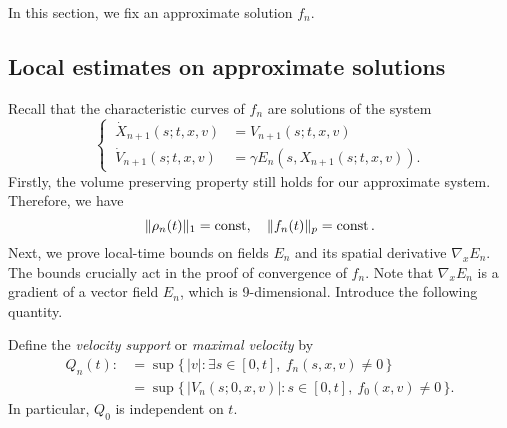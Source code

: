 \documentclass{article}
\begin{document}
In this section, we fix an approximate solution $f_n$.


\subsection{Local estimates on approximate solutions}
Recall that the characteristic curves of $f_n$ are solutions of the system
\[\left\{\ \begin{alignedat}{2}
\dot X_{n+1}(s;t,x,v)&=V_{n+1}(s;t,x,v)\\
\dot V_{n+1}(s;t,x,v)&=\gamma E_n(s,X_{n+1}(s;t,x,v)).
\end{alignedat}\right.\]
Firstly, the volume preserving property still holds for our approximate system.
Therefore, we have
\[\|\rho_n(t)\|_1=\operatorname{const},\quad\|f_n(t)\|_p=\operatorname{const}.\]
Next, we prove local-time bounds on fields $E_n$ and its spatial derivative $\nabla_xE_n$.
The bounds crucially act in the proof of convergence of $f_n$.
Note that $\nabla_xE_n$ is a gradient of a vector field $E_n$, which is 9-dimensional.
Introduce the following quantity.
\begin{defn}
Define the \emph{velocity support} or \emph{maximal velocity} by
\begin{align*}
Q_n(t):&=\sup\{\,|v|:\exists s\in[0,t],\ f_n(s,x,v)\ne0\,\}\\
&=\sup\{\,|V_n(s;0,x,v)|:s\in[0,t],\ f_0(x,v)\ne0\,\}.
\end{align*}
In particular, $Q_0$ is independent on $t$.
\end{defn}
\end{document}

